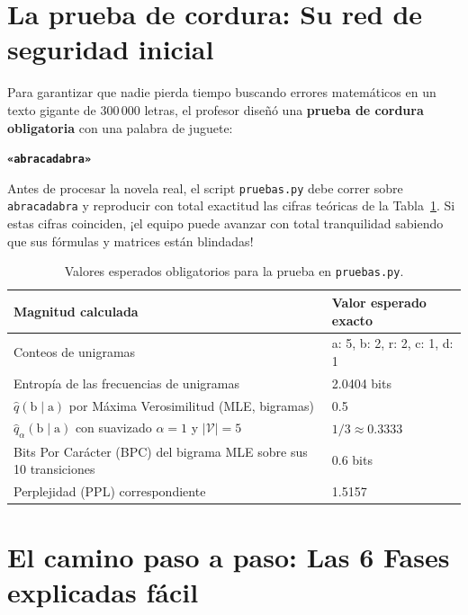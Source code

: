 \documentclass[11pt,letterpaper]{article}
\begin{document}
\section{La prueba de cordura: Su red de seguridad inicial}

Para garantizar que nadie pierda tiempo buscando errores matemáticos en un texto gigante de 300\,000 letras, el profesor diseñó una \textbf{prueba de cordura obligatoria} con una palabra de juguete:
\begin{center}
\texttt{\textbf{«abracadabra»}}
\end{center}
Antes de procesar la novela real, el script \texttt{pruebas.py} debe correr sobre \texttt{abracadabra} y reproducir con total exactitud las cifras teóricas de la Tabla~\ref{tab:cordura}. Si estas cifras coinciden, ¡el equipo puede avanzar con total tranquilidad sabiendo que sus fórmulas y matrices están blindadas!

\begin{table}[H]
\centering
\small
\begin{tabular}{ll}
\toprule
\textbf{Magnitud calculada} & \textbf{Valor esperado exacto} \\
\midrule
Conteos de unigramas & a: 5, b: 2, r: 2, c: 1, d: 1 \\
Entropía de las frecuencias de unigramas & 2.0404 bits \\
$\hat{q}(\text{b} \mid \text{a})$ por Máxima Verosimilitud (MLE, bigramas) & 0.5 \\
$\hat{q}_\alpha(\text{b} \mid \text{a})$ con suavizado $\alpha = 1$ y $|\mathcal{V}| = 5$ & $1/3 \approx 0.3333$ \\
Bits Por Carácter (BPC) del bigrama MLE sobre sus 10 transiciones & 0.6 bits \\
Perplejidad (PPL) correspondiente & 1.5157 \\
\bottomrule
\end{tabular}
\caption{Valores esperados obligatorios para la prueba en \texttt{pruebas.py}.}
\label{tab:cordura}
\end{table}

\section{El camino paso a paso: Las 6 Fases explicadas fácil}
\end{document}
